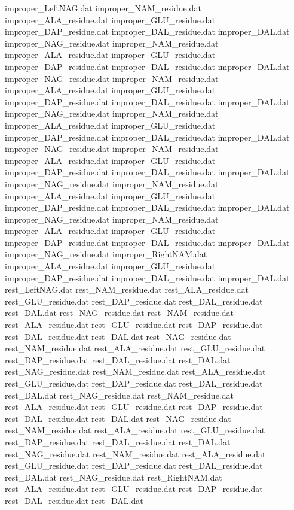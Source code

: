 improper_LeftNAG.dat
improper_NAM_residue.dat
improper_ALA_residue.dat
improper_GLU_residue.dat
improper_DAP_residue.dat
improper_DAL_residue.dat
improper_DAL.dat
improper_NAG_residue.dat
improper_NAM_residue.dat
improper_ALA_residue.dat
improper_GLU_residue.dat
improper_DAP_residue.dat
improper_DAL_residue.dat
improper_DAL.dat
improper_NAG_residue.dat
improper_NAM_residue.dat
improper_ALA_residue.dat
improper_GLU_residue.dat
improper_DAP_residue.dat
improper_DAL_residue.dat
improper_DAL.dat
improper_NAG_residue.dat
improper_NAM_residue.dat
improper_ALA_residue.dat
improper_GLU_residue.dat
improper_DAP_residue.dat
improper_DAL_residue.dat
improper_DAL.dat
improper_NAG_residue.dat
improper_NAM_residue.dat
improper_ALA_residue.dat
improper_GLU_residue.dat
improper_DAP_residue.dat
improper_DAL_residue.dat
improper_DAL.dat
improper_NAG_residue.dat
improper_NAM_residue.dat
improper_ALA_residue.dat
improper_GLU_residue.dat
improper_DAP_residue.dat
improper_DAL_residue.dat
improper_DAL.dat
improper_NAG_residue.dat
improper_NAM_residue.dat
improper_ALA_residue.dat
improper_GLU_residue.dat
improper_DAP_residue.dat
improper_DAL_residue.dat
improper_DAL.dat
improper_NAG_residue.dat
improper_RightNAM.dat
improper_ALA_residue.dat
improper_GLU_residue.dat
improper_DAP_residue.dat
improper_DAL_residue.dat
improper_DAL.dat
rest_LeftNAG.dat
rest_NAM_residue.dat
rest_ALA_residue.dat
rest_GLU_residue.dat
rest_DAP_residue.dat
rest_DAL_residue.dat
rest_DAL.dat
rest_NAG_residue.dat
rest_NAM_residue.dat
rest_ALA_residue.dat
rest_GLU_residue.dat
rest_DAP_residue.dat
rest_DAL_residue.dat
rest_DAL.dat
rest_NAG_residue.dat
rest_NAM_residue.dat
rest_ALA_residue.dat
rest_GLU_residue.dat
rest_DAP_residue.dat
rest_DAL_residue.dat
rest_DAL.dat
rest_NAG_residue.dat
rest_NAM_residue.dat
rest_ALA_residue.dat
rest_GLU_residue.dat
rest_DAP_residue.dat
rest_DAL_residue.dat
rest_DAL.dat
rest_NAG_residue.dat
rest_NAM_residue.dat
rest_ALA_residue.dat
rest_GLU_residue.dat
rest_DAP_residue.dat
rest_DAL_residue.dat
rest_DAL.dat
rest_NAG_residue.dat
rest_NAM_residue.dat
rest_ALA_residue.dat
rest_GLU_residue.dat
rest_DAP_residue.dat
rest_DAL_residue.dat
rest_DAL.dat
rest_NAG_residue.dat
rest_NAM_residue.dat
rest_ALA_residue.dat
rest_GLU_residue.dat
rest_DAP_residue.dat
rest_DAL_residue.dat
rest_DAL.dat
rest_NAG_residue.dat
rest_RightNAM.dat
rest_ALA_residue.dat
rest_GLU_residue.dat
rest_DAP_residue.dat
rest_DAL_residue.dat
rest_DAL.dat
